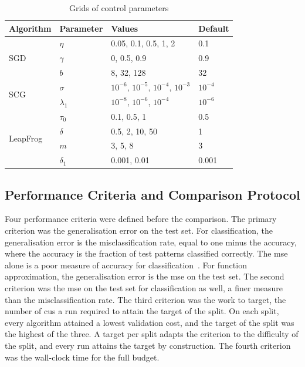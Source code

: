 \documentclass[conference]{IEEEtran}
\begin{document}
\begin{table}[t]
\centering
\caption{Grids of control parameters}
\label{tab:grids}
\footnotesize
\begin{tabular}{@{}llll@{}}
\toprule
Algorithm & Parameter & Values & Default \\
\midrule
\multirow{3}{*}{SGD} & $\eta$ & 0.05, 0.1, 0.5, 1, 2 & 0.1 \\
 & $\gamma$ & 0, 0.5, 0.9 & 0.9 \\
 & $b$ & 8, 32, 128 & 32 \\
\midrule
\multirow{2}{*}{SCG} & $\sigma$ & $10^{-6}$, $10^{-5}$, $10^{-4}$, $10^{-3}$ & $10^{-4}$ \\
 & $\lambda_1$ & $10^{-8}$, $10^{-6}$, $10^{-4}$ & $10^{-6}$ \\
\midrule
\multirow{4}{*}{LeapFrog} & $\tau_0$ & 0.1, 0.5, 1 & 0.5 \\
 & $\delta$ & 0.5, 2, 10, 50 & 1 \\
 & $m$ & 3, 5, 8 & 3 \\
 & $\delta_1$ & 0.001, 0.01 & 0.001 \\
\bottomrule
\end{tabular}
\end{table}

\subsection{Performance Criteria and Comparison Protocol}

Four performance criteria were defined before the comparison. The primary
criterion was the generalisation error on the test set. For classification, the
generalisation error is the misclassification rate, equal to one minus the
accuracy, where the accuracy is the fraction of test patterns classified correctly.
The \gls{mse} alone is a poor measure of accuracy for
classification~\cite{engelbrecht2007}. For
function approximation, the generalisation error is the \gls{mse} on the test set.
The second criterion was the \gls{mse} on the test set for classification as well,
a finer measure than the misclassification rate. The third criterion was the work
to target, the number of \glspl{cu} a run required to attain the target of the
split. On each split, every algorithm attained a lowest validation cost, and the target
of the split was the highest of the three. A target per split adapts the
criterion to the difficulty of the split, and every run attains the target by
construction. The fourth criterion was the wall-clock time for the full budget.
\end{document}
